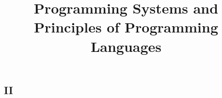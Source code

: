 
\begin{preamble}
\part{II}
\title{Programming Systems and Principles of Programming Languages}
\end{preamble}

\begin{questions}


\question

\newenvironment{bnf}{
    \begin{tabbing}
    XXXXXXX \= XXXX \= XXXXXXXXXXXXXXXXXXXXXXXXXXXXXXXXXX\kill}{
    \end{tabbing}
    }

\newcommand{\nt}[1]{{\it #1\/}}
\newcommand{\Or}[1]{\ \ $|$ \ \ #1}
\newcommand{\Rule}[2]{{\it #1} \> $\rightarrow$ \> #2}


\end{questions}
